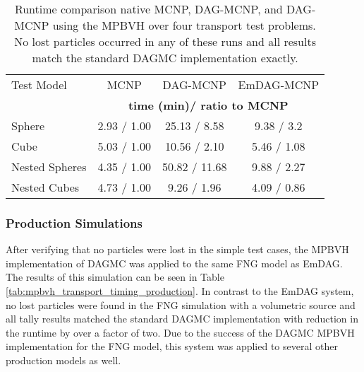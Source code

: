 \begin{table}[H]
  \small
  \begin{center}
    \begin{tabular}{lccc}

      \toprule
      Test Model & MCNP & DAG-MCNP & EmDAG-MCNP \\
      & \multicolumn{3}{c}{\textbf{time (min)/ ratio to MCNP}} \\
      \hline
      Sphere         & 2.93 / 1.00 & 25.13 / 8.58  & 9.38 / 3.2  \\
      Cube           & 5.03 / 1.00 & 10.56 / 2.10 & 5.46 / 1.08 \\
      Nested Spheres & 4.35 / 1.00  & 50.82 / 11.68  & 9.88 / 2.27 \\
      Nested Cubes   & 4.73 / 1.00 & 9.26 / 1.96 & 4.09 / 0.86 \\
      \bottomrule
    \end{tabular}
  \end{center}
  \caption{Runtime comparison native MCNP, DAG-MCNP, and DAG-MCNP using the
    MPBVH over four transport test problems. No lost particles occurred in any of
  these runs and all results match the standard DAGMC implementation exactly.}
  \label{tab:mpbvh_transport_timing_simple}
\end{table}

\subsubsection{Production Simulations}\label{subsec:mpbvh_production_transport}

After verifying that no particles were lost in the simple test cases, the MPBVH
implementation of DAGMC was applied to the same FNG model as EmDAG. The results
of this simulation can be seen in Table
\ref{tab:mpbvh_transport_timing_production}. In contrast to the EmDAG system, no
lost particles were found in the FNG simulation with a volumetric source and all
tally results matched the standard DAGMC implementation with reduction in the
runtime by over a factor of two. Due to the success of the DAGMC MPBVH
implementation for the FNG model, this system was applied to several other
production models as well.


